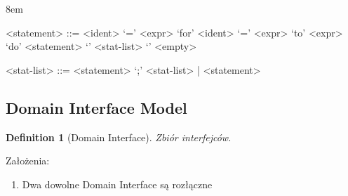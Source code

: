 \documentclass[a4paper,10pt]{article}
\newtheorem{defi}{Definition}[section]
\begin{document}

\grammarindent8em

\begin{grammar}
<statement> ::= <ident> ‘=’ <expr> \alt ‘for’ <ident> ‘=’ <expr> ‘to’ <expr> ‘do’ <statement> \alt ‘{’ <stat-list> ‘}’ \alt <empty>

<stat-list> ::= <statement> ‘;’ <stat-list> | <statement>
\end{grammar}





\subsection{Domain Interface Model}

\begin{defi}[Domain Interface]
  Zbiór interfejców.
\end{defi}

Założenia:
\begin{enumerate}
 \item Dwa dowolne Domain Interface są rozłączne
\end{enumerate}
\end{document}
